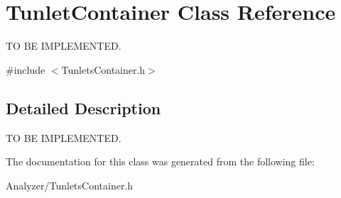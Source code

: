 \hypertarget{class_tunlet_container}{\section{Tunlet\-Container Class Reference}
\label{class_tunlet_container}
}


T\-O B\-E I\-M\-P\-L\-E\-M\-E\-N\-T\-E\-D.  




{\ttfamily \#include $<$Tunlets\-Container.\-h$>$}



\subsection{Detailed Description}
T\-O B\-E I\-M\-P\-L\-E\-M\-E\-N\-T\-E\-D. 

The documentation for this class was generated from the following file\-:\begin{DoxyCompactItemize}
\item 
Analyzer/Tunlets\-Container.\-h\end{DoxyCompactItemize}
